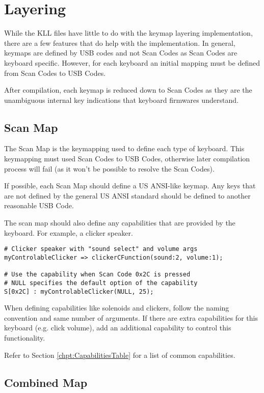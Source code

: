 \documentclass{kiibohd-template}
\begin{document}
\chapter{Layering}

While the KLL files have little to do with the keymap layering implementation, there are a few features that do help with the implementation.
In general, keymaps are defined by USB codes and not Scan Codes as Scan Codes are keyboard specific.
However, for each keyboard an initial mapping must be defined from Scan Codes to USB Codes.

After compilation, each keymap is reduced down to Scan Codes as they are the unambiguous internal key indications that keyboard firmwares understand.


\section{Scan Map}

The Scan Map is the keymapping used to define each type of keyboard.
This keymapping must used Scan Codes to USB Codes, otherwise later compilation process will fail (as it won't be possible to resolve the Scan Codes).

If possible, each Scan Map should define a US ANSI-like keymap.
Any keys that are not defined by the general US ANSI standard should be defined to another reasonable USB Code.

The scan map should also define any capabilities that are provided by the keyboard.
For example, a clicker speaker.

\begin{lstlisting}
# Clicker speaker with "sound select" and volume args
myControlableClicker => clickerCFunction(sound:2, volume:1);

# Use the capability when Scan Code 0x2C is pressed
# NULL specifies the default option of the capability
S[0x2C] : myControlableClicker(NULL, 25);
\end{lstlisting}

When defining capabilities like solenoids and clickers, follow the naming convention and same number of arguments.
If there are extra capabilities for this keyboard (e.g. click volume), add an additional capability to control this functionality.

Refer to Section \ref{chpt:CapabilitiesTable} for a list of common capabilities.


\section{Combined Map}
\end{document}
